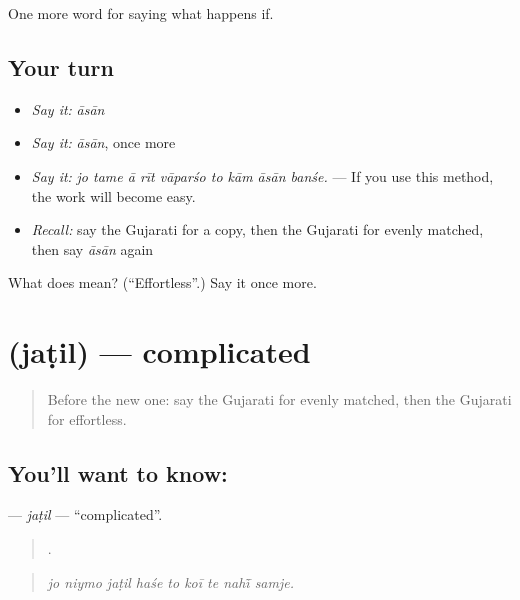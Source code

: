 \begin{grammarlens}[title={What you've built}]
One more word for saying what happens if.
\end{grammarlens}

\subsection*{Your turn}
\begin{itemize}
\raggedright
  \item \emph{Say it:} \emph{āsān}
  \item \emph{Say it:} \emph{āsān}, once more
  \item \emph{Say it:} \emph{jo tame ā rīt vāparśo to kām āsān banśe.} — If you use this method, the work will become easy.
  \item \emph{Recall:} say the Gujarati for a copy, then the Gujarati for evenly matched, then say \emph{āsān} again
\end{itemize}

\begin{tcolorbox}[breakable,colback=teal!4,colframe=teal!35!black,title={Before you move on}]
What does  mean? (\textquotedblleft{}Effortless\textquotedblright{}.) Say it once more.
\end{tcolorbox}
\section[\texorpdfstring{\gu{જટિલ} (jaṭil)}{જટિલ (jaṭil)}]{ (jaṭil) — complicated}

\label{lesson:GU-C545-jatil}



\begin{quote}
Before the new one: say the Gujarati for evenly matched, then the Gujarati for effortless.
\end{quote}

\subsection*{You'll want to know: }
\textbf{} — \emph{jaṭil} — \textquotedblleft{}complicated\textquotedblright{}.

\begin{quote}
        .
\end{quote}

\begin{quote}
\emph{jo niymo jaṭil haśe to koī te nahī̃ samje.}
\end{quote}


